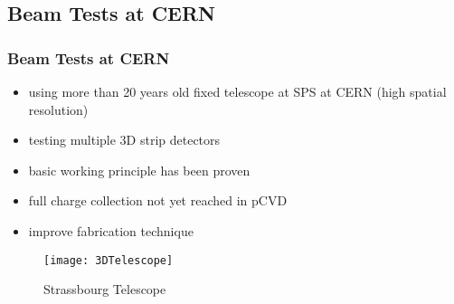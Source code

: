 \subsection{Beam Tests at CERN}
\begin{frame}
	\frametitle{Beam Tests at CERN}
	\begin{itemize}
		\setlength{\itemsep}{\fill}
		\item using more than 20 years old fixed telescope at SPS at CERN (high spatial resolution)
		\item testing multiple 3D strip detectors
		\item basic working principle has been proven
		\item full charge collection not yet reached in pCVD
		\item improve fabrication technique
	\end{itemize}
	\begin{figure}
		\centering
		\texttt{[image: 3DTelescope]}
		\caption{Strassbourg Telescope}
	\end{figure}
\end{frame}
